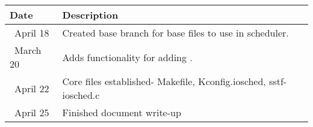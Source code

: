 \begin{tabular}{l l}\textbf{Date} & \textbf{Description}\\\hline
\ April 18 & Created base branch for base files to use in scheduler.\\\hline
\ March 20 & Adds functionality for adding .\\\hline
\ April 22 & Core files established- Makefile, Kconfig.iosched, sstf-iosched.c\\\hline
\ April 25 & Finished document write-up \\\hline
\end{tabular}
